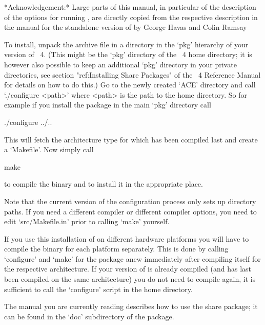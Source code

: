 *Acknowledgement:* Large  parts of this  manual, in particular  of the
description  of the options  for running  {\ACE}, are  directly copied
from  the respective description  in the  manual \cite{HR99a}  for the
standalone version of {\ACE} by George Havas and Colin Ramsay





To  install, unpack  the  archive file  in  a directory  in the  `pkg'
hierarchy  of your  version  of  {\GAP}~4. (This  might  be the  `pkg'
directory of the {\GAP}~4 home  directory; it is however also possible
to keep an additional `pkg' directory in your private directories, see
section  "ref:Installing  Share Packages"  of  the {\GAP}~4  Reference
Manual for details  on how to do this.) Go to  the newly created `ACE'
directory and  call `./configure <path>'  where <path> is the  path to
the {\GAP} home  directory. So for example if  you install the package
in the main `pkg' directory call

\begintt
./configure ../..
\endtt

This  will fetch  the  architecture  type for  which  {\GAP} has  been
compiled last and create a `Makefile'. Now simply call

\begintt
make
\endtt

to compile the binary and to install it in the appropriate place.

Note that the  current version of the configuration  process only sets
up  directory paths.  If you  need a  different compiler  or different
compiler options, you need  to edit `src/Makefile.in' prior to calling
`make' yourself.

If you use this installation of {\GAP} on different hardware platforms
you will have to compile the binary for each platform separately. This
is  done  by calling  `configure'  and  `make'  for the  package  anew
immediately   after  compiling  {\GAP}   itself  for   the  respective
architecture.  If your version of  {\GAP} is already compiled (and has
last  been compiled  on  the same  architecture)  you do  not need  to
compile {\GAP} again, it is  sufficient to call the `configure' script
in the {\GAP} home directory.

The manual you are currently reading describes how to use the {\ACE}
share package; it can be found in the `doc' subdirectory of the package.

